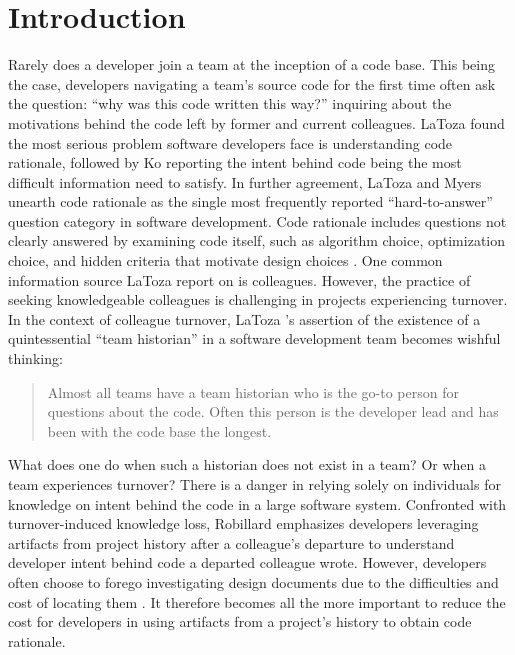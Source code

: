 
\chapter{Introduction}
\label{ch:Introduction}


Rarely does a developer join a team at the inception of a code base. 
This being the case, developers navigating a team's source code for the first time often ask the question: ``why was this code written this way?'' inquiring about the motivations behind the code left by former and current colleagues.
LaToza \etal \cite{latoza_maintaining_2006} found the most serious problem software developers face is understanding code rationale, followed by Ko \etal \cite{ko_information_2007} reporting the intent behind code being the most difficult information need to satisfy. 
In further agreement, LaToza and Myers \cite{latoza_hard-answer_2010} unearth code rationale as the single most frequently reported “hard-to-answer” question category in software development. 
Code rationale includes questions not clearly answered by examining code itself, such as algorithm choice, optimization choice, and hidden criteria that motivate design choices \cite{latoza_hard-answer_2010}. 
One common information source LaToza \etal report on is colleagues. 
However, the practice of seeking knowledgeable colleagues is challenging in projects experiencing turnover. 
In the context of colleague turnover, LaToza \etal 's assertion of the existence of a quintessential ``team historian'' in a software development team \cite{latoza_maintaining_2006} becomes wishful thinking:

\begin{quote}
Almost all teams have a team historian who is the go-to person for questions about the
code. Often this person is the developer lead and has been with the code base the longest.
\end{quote}

What does one do when such a historian does not exist in a team? Or when a team experiences turnover?
There is a danger in relying solely on individuals for knowledge on intent behind the code in a large software system.
Confronted with turnover-induced knowledge loss, Robillard \cite{robillard_turnover-induced_2021} emphasizes developers leveraging artifacts from project history after a colleague’s departure to understand developer intent behind code a departed colleague wrote. 
However, developers often choose to forego investigating design documents due to the difficulties and cost of locating them \cite{latoza_maintaining_2006}.
It therefore becomes all the more important to reduce the cost for developers in using artifacts from a project's history to obtain code rationale. 

